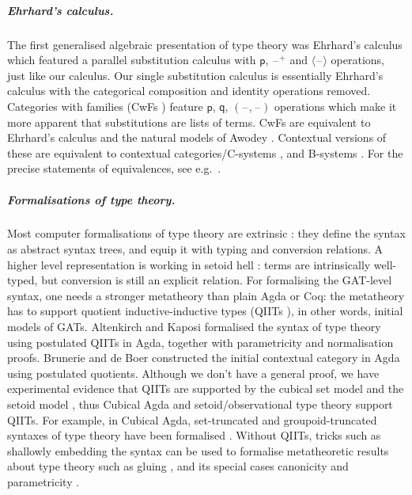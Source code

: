 \documentclass[submission,copyright,creativecommons]{eptcs}
\newcommand{\p}{\mathsf{p}}
\newcommand{\q}{\mathsf{q}}
\newcommand{\blank}{\mathord{\hspace{1pt}\text{--}\hspace{1pt}}} %
\begin{document}
\vspace{-1em}
\subparagraph*{Ehrhard's calculus.}
The first generalised algebraic presentation of type theory was
Ehrhard's calculus \cite{ehrhard,coquandEhrhard} which featured a
parallel substitution calculus with $\p$, $\blank^+$ and
$\langle\blank\rangle$ operations, just like our calculus. Our
single substitution calculus is essentially Ehrhard's calculus with
the categorical composition and identity operations
removed. Categories with families (CwFs
\cite{DBLP:conf/types/Dybjer95,Castellan2021}) feature $\p$, $\q$,
$(\blank,\blank)$ operations which make it more apparent that
substitutions are lists of terms. CwFs are equivalent to Ehrhard's
calculus and the natural models of Awodey \cite{DBLP:journals/mscs/Awodey18}. Contextual versions of these are equivalent to contextual categories/C-systems
\cite{DBLP:journals/apal/Cartmell86,DBLP:journals/lmcs/AhrensLV18}, and
B-systems \cite{bc}. For the precise statements of equivalences, see e.g.\ \cite{DBLP:conf/aplas/AhrensLN24}.

\vspace{-1em}
\subparagraph*{Formalisations of type theory.}
Most computer formalisations of type theory are extrinsic
\cite{DBLP:journals/pacmpl/0001OV18,DBLP:conf/cpp/AdjedjLMPP24,DBLP:journals/jar/SozeauABCFKMTW20}:
they define the syntax as abstract syntax trees, and equip it with
typing and conversion relations. A higher level representation is
working in setoid hell \cite{chapman09eatitself,setoidhell}: terms are
intrinsically well-typed, but conversion is still an explicit
relation. For formalising the GAT-level syntax, one needs a stronger
metatheory than plain Agda or Coq: the metatheory has to support
quotient inductive-inductive types (QIITs
\cite{DBLP:journals/pacmpl/KaposiKA19}), in other words, initial
models of GATs. Altenkirch and Kaposi
\cite{DBLP:conf/popl/AltenkirchK16} formalised the syntax of type
theory using postulated QIITs in Agda, together with parametricity and
normalisation \cite{lmcs:4005} proofs. Brunerie and de Boer
\cite{initiality-agda} constructed the initial contextual category in
Agda using postulated quotients. Although we don't have a general
proof, we have experimental evidence that QIITs are supported by the
cubical set model \cite{DBLP:conf/lics/CoquandHM18} and the setoid
model \cite{kaposi-qiit-setoid}, thus Cubical Agda
\cite{DBLP:journals/jfp/VezzosiMA21} and setoid/observational type
theory \cite{DBLP:conf/mpc/AltenkirchBKT19,DBLP:phd/hal/Pujet22} support QIITs. For example,
in Cubical Agda, set-truncated and groupoid-truncated syntaxes of type
theory have been formalised \cite{cohtt}. Without QIITs, tricks such
as shallowly embedding the syntax can be used to formalise metatheoretic
results about type theory such as gluing
\cite{glue}, and its special cases
canonicity and parametricity \cite{DBLP:conf/mpc/KaposiKK19}.
\end{document}
